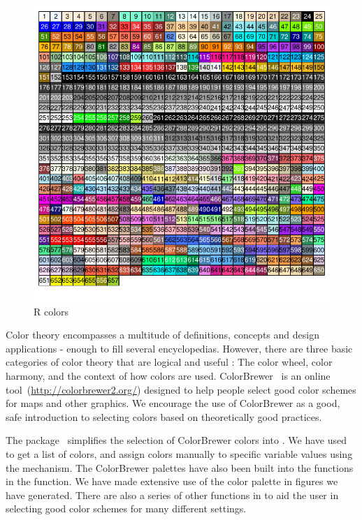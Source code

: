 \documentclass[nojss]{jss}\usepackage[]{graphicx}\usepackage[]{color}
\makeatletter
\def\maxwidth{ %
  \ifdim\Gin@nat@width>\linewidth
    \linewidth
  \else
    \Gin@nat@width
  \fi
}
\newenvironment{knitrout}{}{} %
\makeatother
\begin{document}
\begin{knitrout}\footnotesize
{}\color{fgcolor}\begin{figure}[htpb]

{\centering \includegraphics[width=\maxwidth]{figure/beamer-colorChart-1} 

}

\caption[R colors]{R colors\label{F:colorChart}}
\end{figure}


\end{knitrout}

Color theory encompasses a multitude of definitions, concepts and design applications - enough to fill several encyclopedias. However, there are three basic categories of color theory that are logical and useful : The color wheel, color harmony, and the context of how colors are used. ColorBrewer~\citep{Brewer:2003} is an online tool~(\url{http://colorbrewer2.org/}) designed to help people select good color schemes for maps and other graphics. We encourage the use of ColorBrewer as a good, safe introduction to selecting colors based on theoretically good practices. 

The  package~\citep{Neuwirth:2011} simplifies the selection of ColorBrewer colors into . We have used  to get a list of colors, and assign colors manually to specific variable values using the   mechanism. The ColorBrewer palettes have also been built into the   functions in the  function. We have made extensive use of the  color palette in figures we have generated. There are also a series of other  functions in  to aid the user in selecting good color schemes for many different settings.
\end{document}
